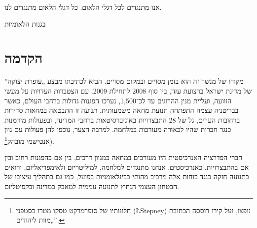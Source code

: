 אנו מתנגדים לכל דגלי הלאום.
כל דגלי הלאום מתנגדים לנו.

בגנות הלאומיות

\section*{הקדמה}

מקורו של מנשר זה הוא בזמן מסויים ובמקום מסויים. הביא לכתיבתו מבצע „עופרת יצוקה” של מדינת ישראל ברצועת עזה, בין סוף 2008 לתחילת  2009. עם הצטברות העדויות על מעשי הזוועה, ועליית מנין ההרוגים עד לכ־1,500, נערכו הפגנות גדולות ברחבי העולם, כאשר בבריטניה עצמה  התפתחה תנועת מחאה משמעותית. תנועה זו התבטאה במחאות סדירות ברחובות הערים, גל של 28 התבצרויות באוניברסיטאות ברחבי המדינה, ובפעולות מזדמנות כנגד חברות שהיו לכאורה מעורבות במלחמה. למרבה הצער, נוספו להן  פעולות עם גוון אנטישמי מובהק\footnote{חלונותיו  של סופרמרקט טסקו מטרו בסטפני (\L{Stepney}) נופצו, ועל קירו  רוססה  הכתובת „מוות ליהודים”.}).

חברי הפדרציה האנרכיסטית היו מעורבים במחאה במגוון דרכים, בין אם בהפגנות רחוב ובין אם בהתבצרויות. כאנרכיסטים, אנחנו מתנגדים למלחמה, למיליטריזם ולאימפריאליזם, ורואים בתנועה חזקה כנגד כוחות אלה מרכיב מהותי בבינלאומניות  בפועל, כמו גם בתהליך עיצובו של הבטחון העצמי הנחוץ לתנועה עממית  למאבק במדינה ובקפיטליזם.

